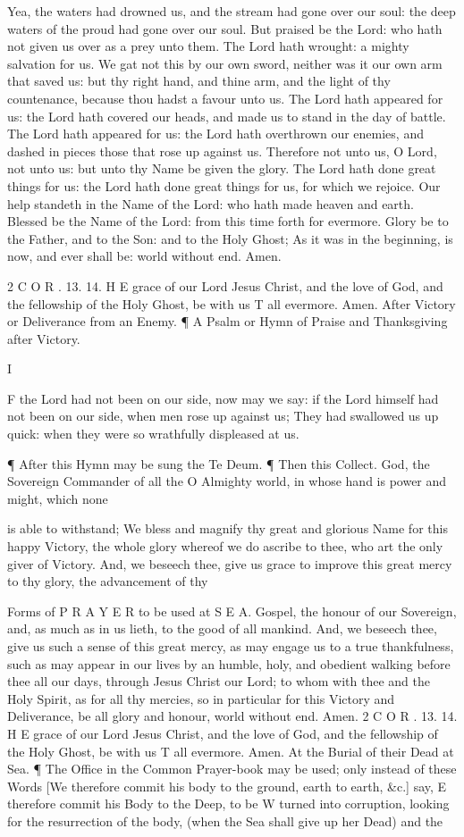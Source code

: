Yea, the waters had drowned us, and the stream had gone over our soul: the deep waters of the proud had gone over our soul. But praised be the Lord: who hath not given us over as a prey unto them. The Lord hath wrought: a mighty salvation for us. We gat not this by our own sword, neither was it our own arm that saved us: but thy right hand, and thine arm, and the light of thy countenance, because thou hadst a favour unto us. The Lord hath appeared for us: the Lord hath covered our heads, and made us to stand in the day of battle. The Lord hath appeared for us: the Lord hath overthrown our enemies, and dashed in pieces those that rose up against us. Therefore not unto us, O Lord, not unto us: but unto thy Name be given the glory. The Lord hath done great things for us: the Lord hath done great things for us, for which we rejoice. Our help standeth in the Name of the Lord: who hath made heaven and earth. Blessed be the Name of the Lord: from this time forth for evermore. Glory be to the Father, and to the Son: and to the Holy Ghost; As it was in the beginning, is now, and ever shall be: world without end. Amen.

2 C O R . 13. 14. H E grace of our Lord Jesus Christ, and the love of God, and the fellowship of the Holy Ghost, be with us T all evermore. Amen. After Victory or Deliverance from an Enemy. ¶ A Psalm or Hymn of Praise and Thanksgiving after Victory.

I

F the Lord had not been on our side, now may we say: if the Lord himself had not been on our side, when men rose up against us; They had swallowed us up quick: when they were so wrathfully displeased at us.

¶ After this Hymn may be sung the Te Deum. ¶ Then this Collect. God, the Sovereign Commander of all the O Almighty world, in whose hand is power and might, which none

is able to withstand; We bless and magnify thy great and glorious Name for this happy Victory, the whole glory whereof we do ascribe to thee, who art the only giver of Victory. And, we beseech thee, give us grace to improve this great mercy to thy glory, the advancement of thy

Forms of P R A Y E R to be used at S E A. Gospel, the honour of our Sovereign, and, as much as in us lieth, to the good of all mankind. And, we beseech thee, give us such a sense of this great mercy, as may engage us to a true thankfulness, such as may appear in our lives by an humble, holy, and obedient walking before thee all our days, through Jesus Christ our Lord; to whom with thee and the Holy Spirit, as for all thy mercies, so in particular for this Victory and Deliverance, be all glory and honour, world without end. Amen. 2 C O R . 13. 14. H E grace of our Lord Jesus Christ, and the love of God, and the fellowship of the Holy Ghost, be with us T all evermore. Amen. At the Burial of their Dead at Sea. ¶ The Office in the Common Prayer-book may be used; only instead of these Words [We therefore commit his body to the ground, earth to earth, \&c.] say, E therefore commit his Body to the Deep, to be W turned into corruption, looking for the resurrection of the body, (when the Sea shall give up her Dead) and the

